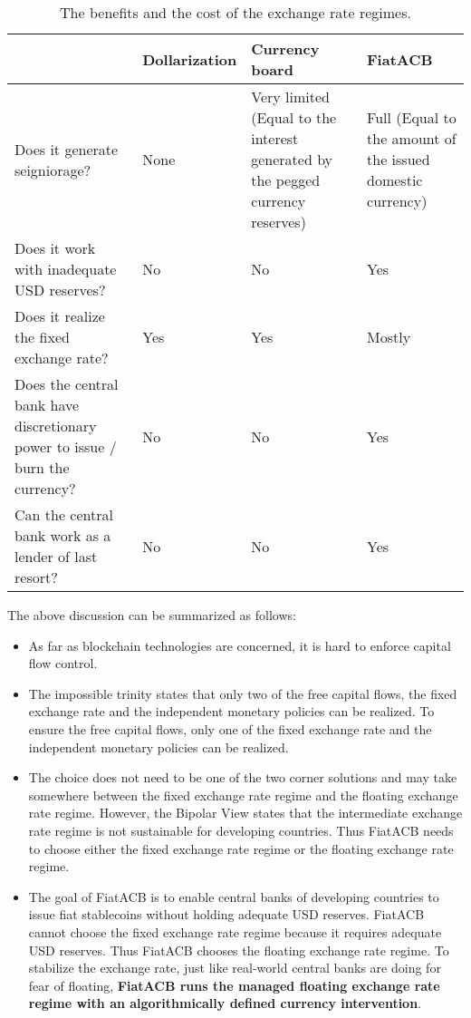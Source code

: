 \documentclass[dvipdfmx,a4paper]{article}
\begin{document}
\begin{table}[tb]
\begin{center}
\caption{The benefits and the cost of the exchange rate regimes.}\vspace{2ex}
\begin{tabular}{p{14em}|l|p{10em}|p{8em}}\hline
& Dollarization & Currency board & FiatACB\\\hline
Does it generate seigniorage? & None & Very limited (Equal to the interest generated by the pegged currency reserves) & Full (Equal to the amount of the issued domestic currency)\\
Does it work with inadequate USD reserves? & No & No & Yes\\
Does it realize the fixed exchange rate? & Yes & Yes & Mostly\\
Does the central bank have discretionary power to issue / burn the currency? & No & No & Yes\\
Can the central bank work as a lender of last resort? & No & No & Yes\\\hline
\end{tabular}
\label{pros_cons_regimes}
\end{center}
\end{table}

The above discussion can be summarized as follows:

\begin{itemize}
\item As far as blockchain technologies are concerned, it is hard to enforce capital flow control.
\item The impossible trinity states that only two of the free capital flows, the fixed exchange rate and the independent monetary policies can be realized. To ensure the free capital flows, only one of the fixed exchange rate and the independent monetary policies can be realized.
\item The choice does not need to be one of the two corner solutions and may take somewhere between the fixed exchange rate regime and the floating exchange rate regime. However, the Bipolar View states that the intermediate exchange rate regime is not sustainable for developing countries. Thus FiatACB needs to choose either the fixed exchange rate regime or the floating exchange rate regime.
\item The goal of FiatACB is to enable central banks of developing countries to issue fiat stablecoins without holding adequate USD reserves. FiatACB cannot choose the fixed exchange rate regime because it requires adequate USD reserves. Thus FiatACB chooses the floating exchange rate regime. To stabilize the exchange rate, just like real-world central banks are doing for fear of floating, \textbf{FiatACB runs the managed floating exchange rate regime with an algorithmically defined currency intervention}.
\end{itemize}
\end{document}
